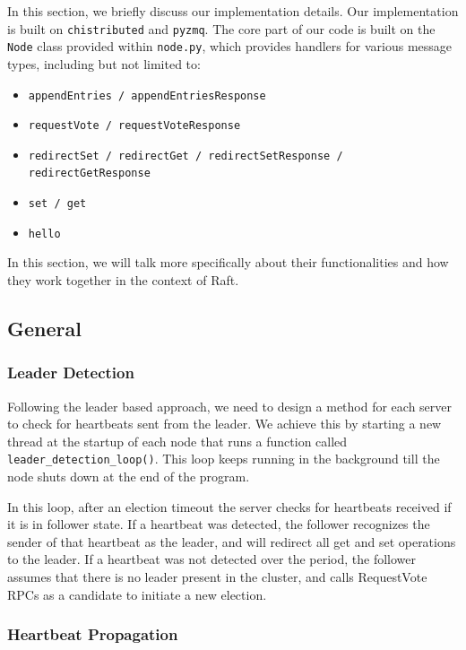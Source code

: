\documentclass[11pt]{article}
\begin{document}
In this section, we briefly discuss our implementation details. Our implementation is built on \texttt{chistributed} and \texttt{pyzmq}. The core part of our code is built on the \texttt{Node} class provided within \texttt{node.py}, which provides handlers for various message types, including but not limited to:
\begin{itemize}
    \item \texttt{appendEntries / appendEntriesResponse}
    \item \texttt{requestVote / requestVoteResponse}
    \item \texttt{redirectSet / redirectGet / redirectSetResponse / redirectGetResponse}
    \item \texttt{set / get}
    \item \texttt{hello}
\end{itemize}

In this section, we will talk more specifically about their functionalities and how they work together in the context of Raft. 
\subsection{General}

\subsubsection{Leader Detection}

Following the leader based approach, we need to design a method for each server to check for heartbeats sent from the leader. We achieve this by starting a new thread at the startup of each node that runs a function called \texttt{leader\_detection\_loop()}. This loop keeps running in the background till the node shuts down at the end of the program.

In this loop, after an election timeout the server checks for heartbeats received if it is in follower state. If a heartbeat was detected, the follower recognizes the sender of that heartbeat as the leader, and will redirect all get and set operations to the leader. If a heartbeat was not detected over the period, the follower assumes that there is no leader present in the cluster, and calls RequestVote RPCs as a candidate to initiate a new election.


\subsubsection{Heartbeat Propagation}
\end{document}
